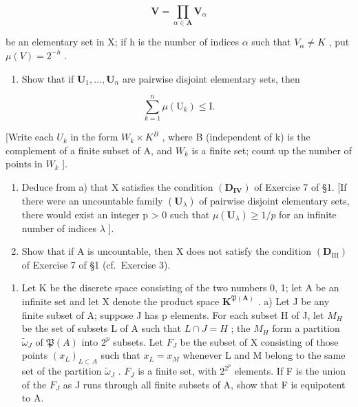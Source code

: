 \[
\mathbf {V} = \prod_ {\alpha \in \mathbf {A}} \mathbf {V} _ {\alpha}
\]

be an elementary set in X; if h is the number of indices \(\alpha\) such that \(V_{\alpha} \neq K\) , put \(\mu(V) = 2^{-h}\) .

\begin{enumerate}
\def\labelenumi{\alph{enumi})}
\tightlist
\item
  Show that if \(\mathbf{U}_1, \ldots, \mathbf{U}_n\) are pairwise disjoint elementary sets, then
\end{enumerate}

\[
\sum_ {k = 1} ^ {n} \mu (\mathrm{U} _ {k}) \leqslant \mathrm{I}.
\]

{[}Write each \(U_{k}\) in the form \(W_{k} \times K^{B}\) , where B (independent of k) is the complement of a finite subset of A, and \(W_{k}\) is a finite set; count up the number of points in \(W_{k}\) {]}.

\begin{enumerate}
\def\labelenumi{\alph{enumi})}
\setcounter{enumi}{1}
\item
  Deduce from a) that X satisfies the condition \((\mathbf{D}_{\mathbf{IV}})\) of Exercise 7 of §1. {[}If there were an uncountable family \((\mathbf{U}_{\lambda})\) of pairwise disjoint elementary sets, there would exist an integer p \textgreater{} 0 such that \(\mu(\mathbf{U}_{\lambda}) \geqslant 1/p\) for an infinite number of indices \(\lambda\) {]}.
\item
  Show that if A is uncountable, then X does not satisfy the condition \((\mathbf{D}_{\mathrm{III}})\) of Exercise 7 of §1 (cf.~Exercise 3).
\end{enumerate}

\begin{enumerate}
\def\labelenumi{\arabic{enumi})}
\setcounter{enumi}{4}
\tightlist
\item
  Let K be the discrete space consisting of the two numbers 0, 1; let A be an infinite set and let X denote the product space \(\mathbf{K}^{\mathfrak{P}(\mathbf{A})}\) . a) Let J be any finite subset of A; suppose J has p elements. For each subset H of J, let \(M_{H}\) be the set of subsets L of A such that \(L \cap J = H\) ; the \(M_{H}\) form a partition \(\tilde{\omega}_{J}\) of \(\mathfrak{P}(A)\) into \(2^{p}\) subsets. Let \(F_{J}\) be the subset of X consisting of those points \((x_{L})_{L \subset A}\) such that \(x_{L} = x_{M}\) whenever L and M belong to the same set of the partition \(\tilde{\omega}_{J}\) . \(F_{J}\) is a finite set, with \(2^{2^{p}}\) elements. If F is the union of the \(F_{J}\) as J runs through all finite subsets of A, show that F is equipotent to A.
\end{enumerate}

